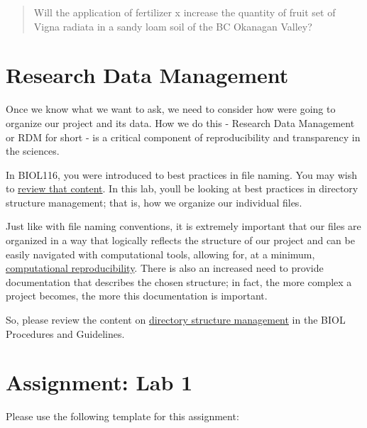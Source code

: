 \documentclass[
]{book}
\begin{document}
\begin{quote}
Will the application of fertilizer x increase the quantity of fruit set of Vigna radiata in a sandy loam soil of the BC Okanagan Valley?
\end{quote}

\hypertarget{research-data-management}{%
\chapter*{Research Data Management}\label{research-data-management}}

Once we know what we want to ask, we need to consider how we\textquotesingle re going to organize our project and it\textquotesingle s data. How we do this - Research Data Management or RDM for short - is a critical component of reproducibility and transparency in the sciences.

In BIOL116, you were introduced to best practices in file naming. You may wish to \href{https://ubco-biology.github.io/Procedures-and-Guidelines/file-naming.html}{review that content}. In this lab, you\textquotesingle ll be looking at best practices in directory structure management; that is, how we organize our individual files.

Just like with file naming conventions, it is extremely important that our files are organized in a way that logically reflects the structure of our project and can be easily navigated with computational tools, allowing for, at a minimum, \href{https://ubco-biology.github.io/BIOL-116-Lab-Manual/computational-reproducibility.html}{computational reproducibility}. There is also an increased need to provide documentation that describes the chosen structure; in fact, the more complex a project becomes, the more this documentation is important.

So, please review the content on \href{https://ubco-biology.github.io/Procedures-and-Guidelines/directory-structures.html}{directory structure management} in the BIOL Procedures and Guidelines.

\hypertarget{assignment-lab-1}{%
\chapter*{Assignment: Lab 1}\label{assignment-lab-1}}

Please use the following template for this assignment:
\end{document}
